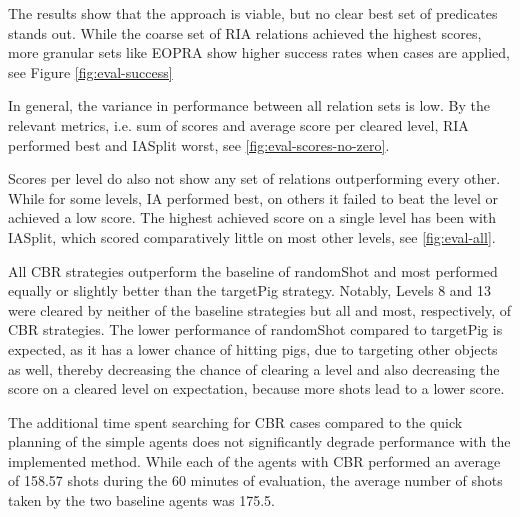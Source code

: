 The results show that the approach is viable, but no clear best set of predicates stands out. While the coarse set of \ac{RIA} relations achieved the highest scores, more granular sets like \ac{EOPRA} show higher success rates when cases are applied, see Figure \ref{fig:eval-success}


In general, the variance in performance between all relation sets is low. By the relevant metrics, i.e. sum of scores and average score per cleared level, \ac{RIA} performed best and \ac{IASplit} worst, see \ref{fig:eval-scores-no-zero}.

Scores per level do also not show any set of relations outperforming every other. While for some levels, \ac{IA} performed best, on others it failed to beat the level or achieved a low score. The highest achieved score on a single level has been with \ac{IASplit}, which scored comparatively little on most other levels, see \ref{fig:eval-all}.

All \ac{CBR} strategies outperform the baseline of randomShot and most performed equally or slightly better than the targetPig strategy. Notably, Levels 8 and 13 were cleared by neither of the baseline strategies but all and most, respectively, of \ac{CBR} strategies.
The lower performance of randomShot compared to targetPig is expected, as it has a lower chance of hitting pigs, due to targeting other objects as well, thereby decreasing the chance of clearing a level and also decreasing the score on a cleared level on expectation, because more shots lead to a lower score.


The additional time spent searching for CBR cases compared to the quick planning of the simple agents does not significantly degrade performance with the implemented method. While each of the agents with \ac{CBR} performed an average of 158.57 shots during the 60 minutes of evaluation, the average number of shots taken by the two baseline agents was 175.5.